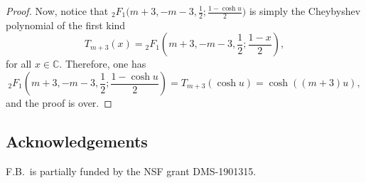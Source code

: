 \documentclass[10pt,a4paper]{amsart}
\numberwithin{equation}{section}
\begin{document}
\begin{proof}
Now, notice that $_2 F_{1} \big(m+3,-m-3,\frac{1}{2};\frac{1-\cosh u }{2 }\big)$ is simply the Cheybyshev polynomial of the first kind
\begin{equation*}
T_{m+3}(x)={_2}F_{1} \left(m+3,-m-3,\frac{1}{2};\frac{1-x }{2 }\right),
\end{equation*}
for all $x\in \mathbb{C}$. Therefore, one has
\begin{equation*}
_2 F_{1} \left(m+3,-m-3,\frac{1}{2};\frac{1-\cosh u }{2 }\right)=T_{m+3}(\cosh u)=\cosh((m+3)u),
\end{equation*}
and the proof is over.
\end{proof}

\subsection*{Acknowledgements}
F.B.~is partially funded by the NSF grant DMS-1901315.
\end{document}
